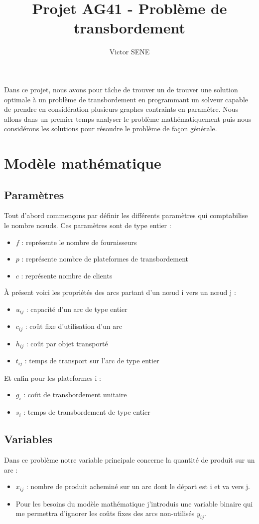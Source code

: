 \documentclass[french]{article}
\author{Victor SENE}
\title{Projet AG41 - Problème de transbordement}
\begin{document}
\maketitle
Dans ce projet, nous avons pour tâche de trouver un de trouver une solution optimale à un problème de transbordement en programmant un solveur capable de prendre en considération plusieurs graphes contraints en paramètre. Nous allons dans un premier temps analyser le problème mathématiquement puis nous considérons les solutions pour résoudre le problème de façon générale.

\section{Modèle mathématique}
	\subsection{Paramètres}
	Tout d'abord commençons par définir les différents paramètres qui comptabilise le nombre nœuds. Ces paramètres sont de type entier : 
	\begin{itemize}
		\item $f$ : représente le nombre de fournisseurs
		\item $p$ : représente nombre de plateformes de transbordement
		\item $c$ : représente nombre de clients
	\end{itemize}
	
	À présent voici les propriétés des arcs partant d'un nœud i vers un nœud j :
	\begin{itemize}
		\item$u_{ij}$ : capacité d'un arc de type entier
		\item $c_{ij}$ : coût fixe d'utilisation d'un arc
		\item $h_{ij}$ : coût par objet transporté
		\item $t_{ij}$ : temps de transport sur l'arc de type entier 
	\end{itemize}
	
	Et enfin pour les plateformes i :
	\begin{itemize}
		\item $g_{i}$ : coût de transbordement unitaire
		\item $s_{i}$ : temps de transbordement de type entier
	\end{itemize}
	
	\subsection{Variables}
	Dans ce problème notre variable principale concerne la quantité de produit sur un arc :
	\begin{itemize}
		\item $x_{ij}$ : nombre de produit acheminé sur un arc dont le départ est i et va vers j.
		\item Pour les besoins du modèle mathématique j'introduis une variable binaire qui me permettra d'ignorer les coûts fixes des arcs non-utilisés $y_{ij}$.
	\end{itemize}
\end{document}
